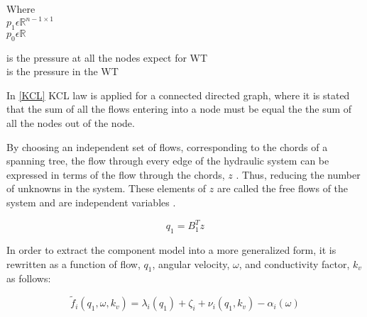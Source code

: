 \begin{minipage}[t]{0.20\textwidth}
Where\\
\hspace*{8mm} $p_1 \epsilon \mathbb{R}^{n-1 \times 1}$  \\
\hspace*{8mm} $p_0 \epsilon \mathbb{R} $ 
\end{minipage}
\begin{minipage}[t]{0.68\textwidth}
\vspace*{2mm}
\hspace*{4mm} is the pressure at all the nodes expect for WT\\
\hspace*{4mm} is the pressure in the WT 
\end{minipage}

In \eqref{KCL} KCL law is applied for a connected directed graph, where it is stated that the sum of all the flows entering 
into a node must be equal the the sum of all the nodes out of the node.

By choosing an independent set of flows, corresponding to the chords of a spanning tree, the 
flow through every edge of the hydraulic system can be expressed in terms of the flow through the chords, $z$ \cite{GraphModel}.
Thus, reducing the number of unknowns in the system. These elements of $z$ are called the free 
flows of the system and are independent variables \cite{GraphTheoryCarsten}.

\begin{equation}
  q_1 = B_1 ^{T}  z
  \label{ChordRelation}
\end{equation}

In order to extract the component model into a more generalized form, it is rewritten as a function of flow, $q_1$, angular velocity, $\omega$, and conductivity factor, $k_v$ as follows:

\begin{equation}
  \tilde{f}_i(q_1, \omega, k_v) = \lambda_i(q_1) + \zeta_i + \nu_i(q_1, k_v) - \alpha_i(\omega)
  \label{ComponentFunction}
\end{equation}

